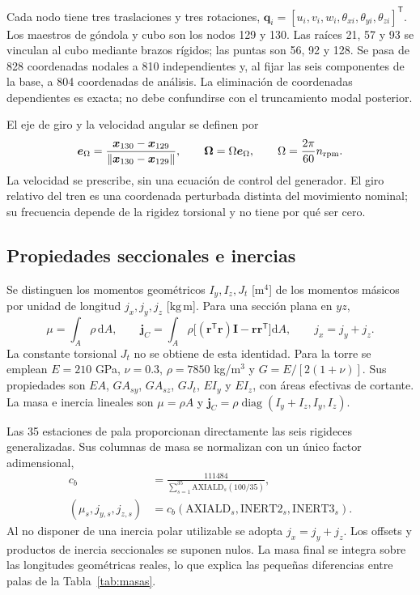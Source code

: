 \documentclass[oneside,a4paper,spanish,links,pagenumbers]{amca}
\newcommand{\I}{\bm I}
\newcommand{\dd}{\mathrm d}
\newcommand{\tr}{\mathsf T}
\newcommand{\diag}{\operatorname{diag}}
\begin{document}
Cada nodo tiene tres traslaciones y tres rotaciones, $\bm q_i=[u_i,v_i,w_i,\theta_{xi},\theta_{yi},\theta_{zi}]^\tr$. Los maestros de góndola y cubo son los nodos 129 y 130. Las raíces 21, 57 y 93 se vinculan al cubo mediante brazos rígidos; las puntas son 56, 92 y 128. Se pasa de 828 coordenadas nodales a 810 independientes y, al fijar las seis componentes de la base, a 804 coordenadas de análisis. La eliminación de coordenadas dependientes es exacta; no debe confundirse con el truncamiento modal posterior.

El eje de giro y la velocidad angular se definen por
\begin{equation}
 \bm e_\Omega=\frac{\bm x_{130}-\bm x_{129}}{\|\bm x_{130}-\bm x_{129}\|},\qquad
 \bm\Omega=\Omega\bm e_\Omega,\qquad \Omega=\frac{2\pi}{60}n_{\rm rpm}.
\end{equation}
La velocidad se prescribe, sin una ecuación de control del generador. El giro relativo del tren es una coordenada perturbada distinta del movimiento nominal; su frecuencia depende de la rigidez torsional y no tiene por qué ser cero.

\subsection{Propiedades seccionales e inercias}
Se distinguen los momentos geométricos $I_y,I_z,J_t$ [$\mathrm{m^4}$] de los momentos másicos por unidad de longitud $j_x,j_y,j_z$ [$\mathrm{kg\,m}$]. Para una sección plana en $yz$,
\begin{equation}
 \mu=\int_A\rho\,\dd A,\qquad
 \bm j_C=\int_A\rho\big[(\bm r^\tr\bm r)\I-\bm r\bm r^\tr\big]\dd A,
 \qquad j_x=j_y+j_z.
 \label{eq:inercia}
\end{equation}
La constante torsional $J_t$ no se obtiene de esta identidad. Para la torre se emplean $E=210$ GPa, $\nu=0.3$, $\rho=7850$ kg/m$^3$ y $G=E/[2(1+\nu)]$. Sus propiedades son $EA$, $GA_{sy}$, $GA_{sz}$, $GJ_t$, $EI_y$ y $EI_z$, con áreas efectivas de cortante. La masa e inercia lineales son $\mu=\rho A$ y $\bm j_C=\rho\diag(I_y+I_z,I_y,I_z)$.

Las 35 estaciones de pala proporcionan directamente las seis rigideces generalizadas. Sus columnas de masa se normalizan con un único factor adimensional,
\begin{equation}
 \begin{aligned}
 c_b&=\frac{111484}{\sum_{s=1}^{35}\mathrm{AXIALD}_s(100/35)},\\
 (\mu_s,j_{y,s},j_{z,s})&=c_b(\mathrm{AXIALD}_s,\mathrm{INERT2}_s,\mathrm{INERT3}_s).
 \end{aligned}
 \label{eq:normalizacion}
\end{equation}
Al no disponer de una inercia polar utilizable se adopta $j_x=j_y+j_z$. Los offsets y productos de inercia seccionales se suponen nulos. La masa final se integra sobre las longitudes geométricas reales, lo que explica las pequeñas diferencias entre palas de la Tabla~\ref{tab:masas}.
\end{document}
